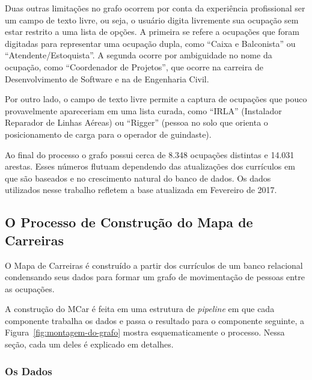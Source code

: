 \documentclass[12pt,a4paper,final]{article}
\begin{document}
Duas outras limitações no grafo ocorrem por conta da experiência profissional ser um campo de texto livre, ou seja, o usuário digita livremente sua ocupação sem estar restrito a uma lista de opções. A primeira se refere a ocupações que foram digitadas para representar uma ocupação dupla, como \enquote{Caixa e Balconista} ou \enquote{Atendente/Estoquista}. A segunda ocorre por ambiguidade no nome da ocupação, como \enquote{Coordenador de Projetos}, que ocorre na carreira de Desenvolvimento de Software e na de Engenharia Civil.

Por outro lado, o campo de texto livre permite a captura de ocupações que pouco provavelmente apareceriam em uma lista curada, como \enquote{IRLA} (Instalador Reparador de Linhas Aéreas) ou \enquote{Rigger} (pessoa no solo que orienta o posicionamento de carga para o operador de guindaste).

Ao final do processo o grafo possui cerca de 8.348 ocupações distintas e 14.031 arestas. Esses números flutuam dependendo das atualizações dos currículos em que são baseados e no crescimento natural do banco de dados. Os dados utilizados nesse trabalho refletem a base atualizada em Fevereiro de 2017.


\subsection{O Processo de Construção do Mapa de Carreiras} \label{sec:construcao}

O Mapa de Carreiras é construído a partir dos currículos de um banco relacional condensando seus dados para formar um grafo de movimentação de pessoas entre as ocupações.

A construção do MCar é feita em uma estrutura de \textit{pipeline} em que cada componente trabalha os dados e passa o resultado para o componente seguinte, a Figura~\ref{fig:montagem-do-grafo} mostra esquematicamente o processo. Nessa seção, cada um deles é explicado em detalhes.

\subsubsection{Os Dados}
\end{document}
